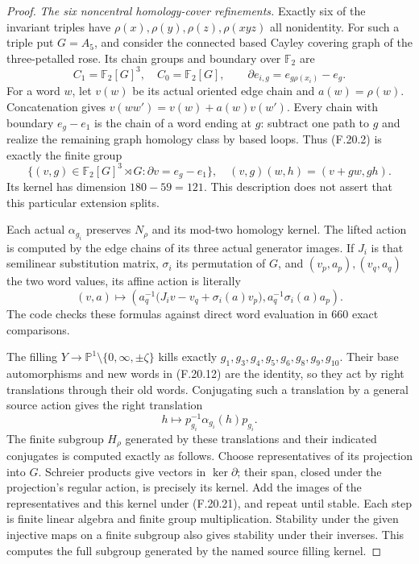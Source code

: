 \begin{proof}
\emph{The six noncentral homology-cover refinements.}
Exactly six of the invariant triples have
$\rho(x),\rho(y),\rho(z),\rho(xyz)$ all nonidentity.
For such a triple put $G=A_5$, and consider the
connected based Cayley covering graph of the
three-petalled rose. Its chain groups and
boundary over $\mathbb F_2$ are
\[
 C_1=\mathbb F_2[G]^3,\quad C_0=\mathbb F_2[G],
 \qquad \partial e_{i,g}=e_{g\rho(x_i)}-e_g .
                                                               \tag{F.20.18}
\]
For a word $w$, let $v(w)$ be its actual oriented
edge chain and $a(w)=\rho(w)$.
Concatenation gives
$v(ww')=v(w)+a(w)v(w')$.
Every chain with boundary $e_g-e_1$ is the chain
of a word ending at $g$: subtract one path to
$g$ and realize the remaining graph homology
class by based loops.
Thus (F.20.2) is exactly the finite group
\[
 \{(v,g)\in\mathbb F_2[G]^3\rtimes G:
                       \partial v=e_g-e_1\},
 \quad
 (v,g)(w,h)=(v+gw,gh).
                                                               \tag{F.20.19}
\]
Its kernel has dimension $180-59=121$.
This description does not assert that this
particular extension splits.

Each actual $\alpha_{g_i}$ preserves $N_\rho$
and its mod-two homology kernel.
The lifted action is computed by the edge
chains of its three actual generator images.
If $J_i$ is that semilinear substitution matrix,
$\sigma_i$ its permutation of $G$, and
$(v_p,a_p),(v_q,a_q)$ the two word values,
its affine action is literally
\[
 (v,a)\longmapsto
 \left(a_q^{-1}\bigl(J_i v-v_q+\sigma_i(a)v_p\bigr),
                         a_q^{-1}\sigma_i(a)a_p\right).
                                                               \tag{F.20.20}
\]
The code checks these formulas against direct
word evaluation in $660$ exact comparisons.

The filling $Y\to
\mathbb P^1\setminus\{0,\infty,\pm\zeta\}$
kills exactly $g_1,g_3,g_4,g_5,g_6,g_8,g_9,g_{10}$.
Their base automorphisms and new words in
(F.20.12) are the identity, so they act by
right translations through their old words.
Conjugating such a translation by a general
source action gives the right translation
\[
                         h\longmapsto
                  p_{g_i}^{-1}\alpha_{g_i}(h)p_{g_i}.
                                                               \tag{F.20.21}
\]
The finite subgroup $H_\rho$ generated by these
translations and their indicated conjugates is
computed exactly as follows. Choose representatives
of its projection into $G$. Schreier products
give vectors in $\ker\partial$; their span,
closed under the projection's regular action,
is precisely its kernel. Add the images of
the representatives and this kernel under
(F.20.21), and repeat until stable.
Each step is finite linear algebra and finite
group multiplication. Stability under the
given injective maps on a finite subgroup
also gives stability under their inverses.
This computes the full subgroup generated
by the named source filling kernel.


\end{proof}
